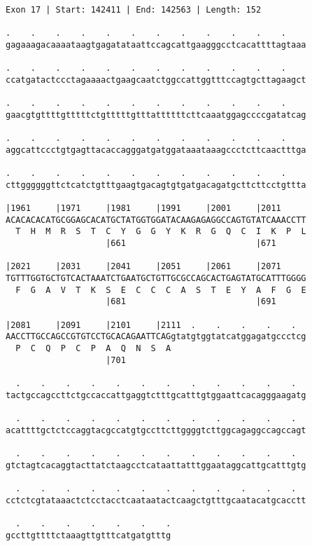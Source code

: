 \documentclass{article}
\begin{document}
\begin{Verbatim}
Exon 17 | Start: 142411 | End: 142563 | Length: 152
 
.    .    .    .    .    .    .    .    .    .    .    .    
gagaaagacaaaataagtgagatataattccagcattgaagggcctcacattttagtaaa
  
.    .    .    .    .    .    .    .    .    .    .    .    
ccatgatactccctagaaaactgaagcaatctggccattggtttccagtgcttagaagct
  
.    .    .    .    .    .    .    .    .    .    .    .    
gaacgtgttttgtttttctgtttttgtttattttttcttcaaatggagccccgatatcag
  
.    .    .    .    .    .    .    .    .    .    .    .    
aggcattccctgtgagttacaccagggatgatggataaataaagccctcttcaactttga
  
.    .    .    .    .    .    .    .    .    .    .    .    
cttggggggttctcatctgtttgaagtgacagtgtgatgacagatgcttcttcctgttta
  
|1961     |1971     |1981     |1991     |2001     |2011     
ACACACACATGCGGAGCACATGCTATGGTGGATACAAGAGAGGCCAGTGTATCAAACCTT
  T  H  M  R  S  T  C  Y  G  G  Y  K  R  G  Q  C  I  K  P  L
                    |661                          |671      
  
|2021     |2031     |2041     |2051     |2061     |2071     
TGTTTGGTGCTGTCACTAAATCTGAATGCTGTTGCGCCAGCACTGAGTATGCATTTGGGG
  F  G  A  V  T  K  S  E  C  C  C  A  S  T  E  Y  A  F  G  E
                    |681                          |691      
  
|2081     |2091     |2101     |2111  .    .    .    .    .  
AACCTTGCCAGCCGTGTCCTGCACAGAATTCAGgtatgtggtatcatggagatgccctcg
  P  C  Q  P  C  P  A  Q  N  S  A                           
                    |701                                    
  
  .    .    .    .    .    .    .    .    .    .    .    .  
tactgccagccttctgccaccattgaggtctttgcatttgtggaattcacagggaagatg
  
  .    .    .    .    .    .    .    .    .    .    .    .  
acattttgctctccaggtacgccatgtgccttcttggggtcttggcagaggccagccagt
  
  .    .    .    .    .    .    .    .    .    .    .    .  
gtctagtcacaggtacttatctaagcctcataattatttggaataggcattgcatttgtg
  
  .    .    .    .    .    .    .    .    .    .    .    .  
cctctcgtataaactctcctacctcaataatactcaagctgtttgcaatacatgcacctt
  
  .    .    .    .    .    .    .
gccttgttttctaaagttgtttcatgatgtttg
\end{Verbatim}
\end{document}
